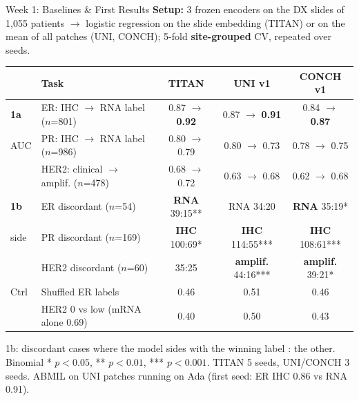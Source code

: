\documentclass[aspectratio=169,10pt]{beamer}
\begin{document}
\begin{frame}[t]{Week 1: Baselines \& First Results}
\footnotesize
\textbf{Setup:} 3 frozen encoders on the DX slides of 1,055 patients $\rightarrow$ logistic regression on the slide
embedding (TITAN) or on the mean of all patches (UNI, CONCH); 5-fold \textbf{site-grouped} CV, repeated over seeds.
\vspace{3pt}

\centering
\scriptsize
\begin{tabular}{llccc}
\toprule
 & Task & TITAN & UNI v1 & CONCH v1 \\
\midrule
\textbf{1a} & ER: IHC $\rightarrow$ RNA label ($n$=801) & 0.87 $\rightarrow$ \textbf{0.92} & 0.87 $\rightarrow$ \textbf{0.91} & 0.84 $\rightarrow$ \textbf{0.87} \\
AUC & PR: IHC $\rightarrow$ RNA label ($n$=986) & 0.80 $\rightarrow$ 0.79 & 0.80 $\rightarrow$ 0.73 & 0.78 $\rightarrow$ 0.75 \\
 & HER2: clinical $\rightarrow$ amplif. ($n$=478) & 0.68 $\rightarrow$ 0.72 & 0.63 $\rightarrow$ 0.68 & 0.62 $\rightarrow$ 0.68 \\
\midrule
\textbf{1b} & ER discordant ($n$=54) & \textbf{RNA} 39:15** & RNA 34:20 & \textbf{RNA} 35:19* \\
side & PR discordant ($n$=169) & \textbf{IHC} 100:69* & \textbf{IHC} 114:55*** & \textbf{IHC} 108:61*** \\
 & HER2 discordant ($n$=60) & 35:25 & \textbf{amplif.} 44:16*** & \textbf{amplif.} 39:21* \\
\midrule
Ctrl & Shuffled ER labels & 0.46 & 0.51 & 0.46 \\
 & HER2 0 vs low (mRNA alone 0.69) & 0.40 & 0.50 & 0.43 \\
\bottomrule
\end{tabular}

\vspace{1pt}
{\tiny 1b: discordant cases where the model sides with the winning label : the other. Binomial * $p<0.05$, ** $p<0.01$, *** $p<0.001$.
TITAN 5 seeds, UNI/CONCH 3 seeds. ABMIL on UNI patches running on Ada (first seed: ER IHC 0.86 vs RNA 0.91).}


\end{frame}
\end{document}

